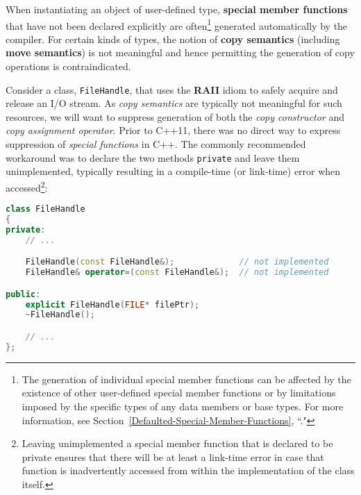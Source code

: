 When instantiating an object of user-defined type, \textbf{special
member functions} that have not been declared explicitly are
often{\cprotect\footnote{The generation of individual special member
functions can be affected by the existence of other user-defined special
member functions or by limitations imposed by the specific types of
any data members or base types. For more information, see Section~\ref{Defaulted-Special-Member-Functions}, ``."}} generated automatically by the compiler.
For certain kinds of types, the notion of \textbf{copy semantics}
(including \textbf{move semantics}) is not meaningful and
hence permitting the generation of copy operations is contraindicated.

Consider a class, \texttt{FileHandle}, that uses the \textbf{RAII} idiom
to safely acquire and release an I/O stream. As \emph{copy semantics}
are typically not meaningful for such resources, we will want to
suppress generation of both the \emph{copy constructor} and \emph{copy
assignment operator}. Prior to C++11, there was no direct way to express
suppression of \emph{special functions} in C++. The commonly
recommended workaround was to declare the two methods \texttt{private}
and leave them unimplemented, typically resulting in a compile-time (or
link-time) error when accessed{\cprotect\footnote{Leaving unimplemented a special
member function that is declared to be private ensures
that there will be at least a link-time error in case that function is
inadvertently accessed from within the implementation of the class
  itself.}}:

\begin{lstlisting}[language=C++]
class FileHandle
{
private:
    // ...

    FileHandle(const FileHandle&);             // not implemented
    FileHandle& operator=(const FileHandle&);  // not implemented

public:
    explicit FileHandle(FILE* filePtr);
    ~FileHandle();

    // ...
};
\end{lstlisting}
    
